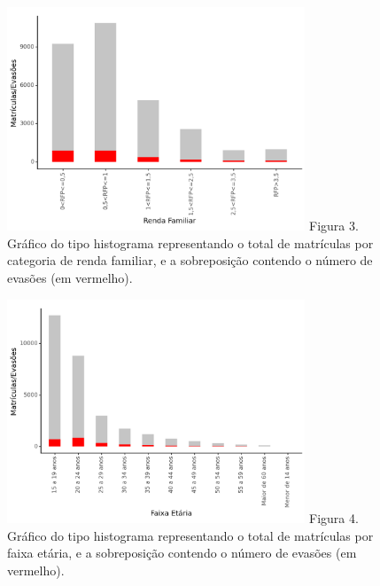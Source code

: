 \documentclass[conference]{IEEEtran}
\begin{document}
\begin{figure}[h]
    \includegraphics[width=8.9cm]{figs/figura-3.png}
    \centering
    Figura 3. Gráfico do tipo histograma representando o total de matrículas por categoria de renda familiar, e a sobreposição contendo o número de evasões (em vermelho).
\end{figure}

\begin{figure}[h]
    \includegraphics[width=8.9cm]{figs/figura-4.png}
    \centering
    Figura 4. Gráfico do tipo histograma representando o total de matrículas por faixa etária, e a sobreposição contendo o número de evasões (em vermelho).
\end{figure}
\end{document}
